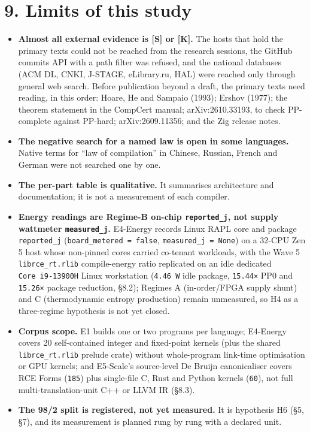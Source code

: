 \documentclass[10pt,letterpaper]{article}
\providecommand{\tightlist}{\setlength{\itemsep}{1pt}\setlength{\parskip}{0pt}}
\begin{document}
\section{9. Limits of this study}\label{limits-of-this-study}

\begin{itemize}
\tightlist
\item
  \textbf{Almost all external evidence is {[}S{]} or {[}K{]}.} The hosts
  that hold the primary texts could not be reached from the research
  sessions, the GitHub commits API with a path filter was refused, and
  the national databases (ACM DL, CNKI, J-STAGE, eLibrary.ru, HAL) were
  reached only through general web search. Before publication beyond a
  draft, the primary texts need reading, in this order: Hoare, He and
  Sampaio (1993); Ershov (1977); the theorem statement in the CompCert
  manual; arXiv:2610.33193, to check PP-complete against PP-hard;
  arXiv:2609.11356; and the Zig release notes.
\item
  \textbf{The negative search for a named law is open in some
  languages.} Native terms for ``law of compilation'' in Chinese,
  Russian, French and German were not searched one by one.
\item
  \textbf{The per-part table is qualitative.} It summarises architecture
  and documentation; it is not a measurement of each compiler.
\item
  \textbf{Energy readings are Regime-B on-chip \texttt{reported\_\allowbreak{}j}, not
  supply wattmeter \texttt{measured\_\allowbreak{}j}.} E4-Energy records Linux RAPL
  core and package \texttt{reported\_\allowbreak{}j}
  (\texttt{board\_\allowbreak{}metered\ =\ false}, \texttt{measured\_\allowbreak{}j\ =\ None}) on
  a 32-CPU Zen 5 host whose non-pinned cores carried co-tenant
  workloads, with the Wave 5 \texttt{librce\_\allowbreak{}rt.\allowbreak{}rlib} compile-energy
  ratio replicated on an idle dedicated \texttt{Core\ i9-\allowbreak{}13900H} Linux
  workstation (\texttt{4.46\ W} idle package, \texttt{15.44×} PP0 and
  \texttt{15.26×} package reduction, §8.2); Regimes A (in-order/FPGA
  supply shunt) and C (thermodynamic entropy production) remain
  unmeasured, so H4 as a three-regime hypothesis is not yet closed.
\item
  \textbf{Corpus scope.} E1 builds one or two programs per language;
  E4-Energy covers 20 self-contained integer and fixed-point kernels
  (plus the shared \texttt{librce\_\allowbreak{}rt.\allowbreak{}rlib} prelude crate) without
  whole-program link-time optimisation or GPU kernels; and E5-Scale's
  source-level De Bruijn canonicaliser covers RCE Forms (\texttt{185})
  plus single-file C, Rust and Python kernels (\texttt{60}), not full
  multi-translation-unit C++ or LLVM IR (§8.3).
\item
  \textbf{The 98/2 split is registered, not yet measured.} It is
  hypothesis H6 (§5, §7), and its measurement is planned rung by rung
  with a declared unit.
\end{itemize}
\end{document}
